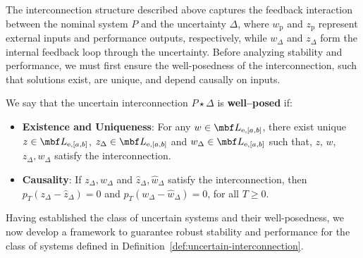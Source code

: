 The interconnection structure described above captures the feedback interaction
between the nominal system $P$ and the uncertainty $\Delta$, where $w_{\mathrm{p}}$ and $z_{\mathrm{p}}$
represent external inputs and performance outputs, respectively, while
$w_\Delta$ and $z_\Delta$ form the internal feedback loop through the
uncertainty.
Before analyzing stability and performance, we must first ensure the
well-posedness of the interconnection, such that solutions exist, are unique,
and depend causally on inputs.
\begin{definition}
We say that the uncertain interconnection $P\star\Delta$ is
\textbf{well--posed} if:
\begin{itemize}
\item \textbf{Existence and Uniqueness}: For any
$w\in \mbf L_{\mathrm{e}, [a, b]}$, there exist unique
$z\in\mbf L_{\mathrm{e}, [a, b]}$,
$z_\Delta \in \mbf L_{\mathrm{e}, [a, b]}$ and
$w_\Delta \in  \mbf L_{\mathrm{e}, [a, b]}$ such that, $z$, $w$,
$z_\Delta, w_\Delta$ satisfy the interconnection.
\item \textbf{Causality}: If $z_\Delta, w_\Delta$ and
$\hat{z}_\Delta, \hat{w}_\Delta$ satisfy the interconnection,
then $p_T(z_\Delta - \hat{z}_\Delta) = 0$ and
$p_T(w_\Delta - \hat{w}_\Delta) = 0$, for all
$T \geq 0$.
\end{itemize}
\end{definition}
Having established the class of uncertain systems and their well-posedness, we
now develop a framework to guarantee robust stability and performance for the
class of systems defined in Definition~\ref{def:uncertain-interconnection}.

